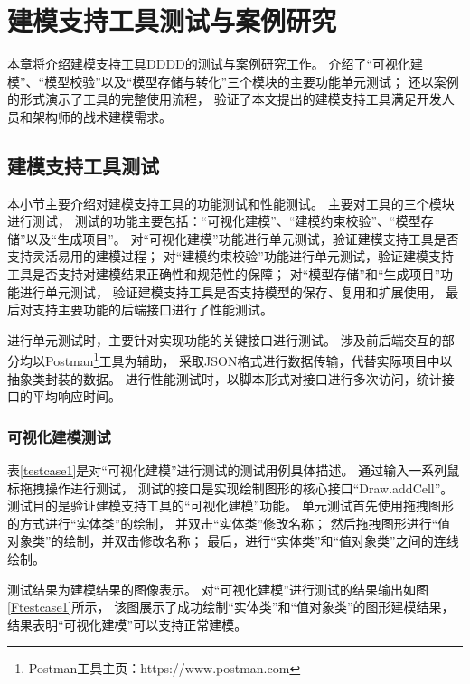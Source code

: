 \chapter{建模支持工具测试与案例研究}

本章将介绍建模支持工具DDDD的测试与案例研究工作。
介绍了“可视化建模”、“模型校验”以及“模型存储与转化”三个模块的主要功能单元测试；
还以案例的形式演示了工具的完整使用流程，
验证了本文提出的建模支持工具满足开发人员和架构师的战术建模需求。


\section{建模支持工具测试}

本小节主要介绍对建模支持工具的功能测试和性能测试。
主要对工具的三个模块进行测试，
测试的功能主要包括：“可视化建模”、“建模约束校验”、“模型存储”以及“生成项目”。
对“可视化建模”功能进行单元测试，验证建模支持工具是否支持灵活易用的建模过程；
对“建模约束校验”功能进行单元测试，验证建模支持工具是否支持对建模结果正确性和规范性的保障；
对“模型存储”和“生成项目”功能进行单元测试，
验证建模支持工具是否支持模型的保存、复用和扩展使用，
最后对支持主要功能的后端接口进行了性能测试。

进行单元测试时，主要针对实现功能的关键接口进行测试。
涉及前后端交互的部分均以Postman\footnote{Postman工具主页：https://www.postman.com}工具为辅助，
采取JSON格式进行数据传输，代替实际项目中以抽象类封装的数据。
进行性能测试时，以脚本形式对接口进行多次访问，统计接口的平均响应时间。

\subsection{可视化建模测试}

表\ref{testcase1}是对“可视化建模”进行测试的测试用例具体描述。
通过输入一系列鼠标拖拽操作进行测试，
测试的接口是实现绘制图形的核心接口“Draw.addCell”。
测试目的是验证建模支持工具的“可视化建模”功能。
单元测试首先使用拖拽图形的方式进行“实体类”的绘制，
并双击“实体类”修改名称；
然后拖拽图形进行“值对象类”的绘制，并双击修改名称；
最后，进行“实体类”和“值对象类”之间的连线绘制。

测试结果为建模结果的图像表示。
对“可视化建模”进行测试的结果输出如图\ref{Ftestcase1}所示，
该图展示了成功绘制“实体类”和“值对象类”的图形建模结果，
结果表明“可视化建模”可以支持正常建模。


